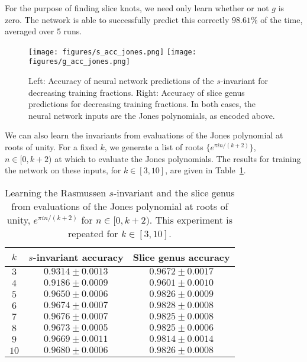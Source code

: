 \documentclass[11pt]{article}
\numberwithin{equation}{section}
\begin{document}
For the purpose of finding slice knots, we need only learn whether or not $g$ is zero. The network is able to successfully predict this correctly $98.61\%$ of the time, averaged over $5$ runs.
\begin{figure}[h!]
    \centering
    \texttt{[image: figures/s\_acc\_jones.png]}
    \texttt{[image: figures/g\_acc\_jones.png]}
    \caption{\small{Left: Accuracy of neural network predictions of the $s$-invariant for decreasing training fractions. Right: Accuracy of slice genus predictions for decreasing training fractions. In both cases, the neural network inputs are the Jones polynomials, as encoded above.}}
    \label{fig:jones_size_acc}
\end{figure}
%
We can also learn the invariants from evaluations of the Jones polynomial at roots of unity.
For a fixed $k$, we generate a list of roots $\{e^{\pi i n/(k+2)}\}$, $n \in [0, k+2)$ at which to evaluate the Jones polynomials.
The results for training the network on these inputs, for $k \in [3, 10]$, are given in Table~\ref{tab:jones_evals}.
\begin{table}[t]
\begin{center}
\begin{tabular}{ |c|c|c|} 
 \hline
 $k$ & $s$-invariant accuracy & Slice genus accuracy\\
 \hline
 \hline
 $3$ & $0.9314 \pm 0.0013$ & $0.9672 \pm 0.0017$\\
 \hline
 $4$ & $0.9186\pm 0.0009$ & $0.9601 \pm 0.0010$\\
 \hline
 $5$ & $0.9650 \pm 0.0006$ & $0.9826 \pm 0.0009$\\
 \hline
 $6$ & $0.9674\pm 0.0007$ & $0.9828 \pm 0.0008$\\
 \hline
 $7$ & $0.9676\pm 0.0007$ & $0.9825\pm 0.0008$\\
 \hline
 $8$ & $0.9673\pm 0.0005$ & $0.9825 \pm 0.0006$\\
 \hline
 $9$ & $0.9669\pm 0.0011$ & $0.9814 \pm 0.0014$\\
 \hline
 $10$ & $0.9680\pm 0.0006$ & $0.9826 \pm 0.0008$\\
 \hline
\end{tabular}
\caption{\small{Learning the Rasmussen $s$-invariant and the slice genus from evaluations of the Jones polynomial at roots of unity, $e^{\pi i n/(k+2)}$ for $n \in [0, k+2)$. This experiment is repeated for $k \in [3, 10]$.}\label{tab:jones_evals}}
\end{center}
\end{table}
\end{document}
